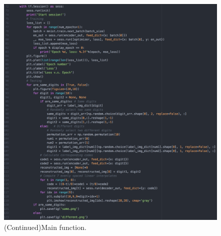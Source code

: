 \documentclass[a4paper]{article}
\begin{document}
\begin{figure}[H]
\centering
\includegraphics[width=1\textwidth]{3.png}
\caption{\label{fig:data}(Continued)Main function.}
\end{figure}
\end{document}
